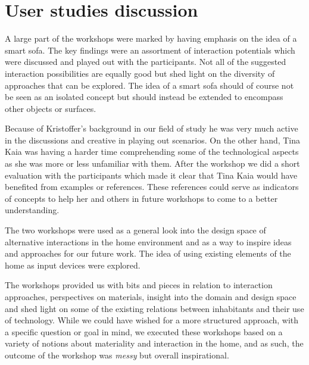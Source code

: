 \section{User studies discussion}

A large part of the workshops were marked by having emphasis on the idea of a smart sofa.
The key findings were an assortment of interaction potentials which were discussed and played out with the participants.
Not all of the suggested interaction possibilities are equally good but shed light on the diversity of approaches that can be explored.
The idea of a smart sofa should of course not be seen as an isolated concept but should instead be extended to encompass other objects or surfaces.

Because of Kristoffer's background in our field of study he was very much active in the discussions and creative in playing out scenarios.
On the other hand, Tina Kaia was having a harder time comprehending some of the technological aspects as she was more or less unfamiliar with them.
After the workshop we did a short evaluation with the participants which made it clear that Tina Kaia would have benefited from examples or references.
These references could serve as indicators of concepts to help her and others in future workshops to come to a better understanding.

The two workshops were used as a general look into the design space of alternative interactions in the home environment and as a way to inspire ideas and approaches for our future work.
The idea of using existing elements of the home as input devices were explored.

The workshops provided us with bits and pieces in relation to interaction approaches, perspectives on materials, insight into the domain and design space and shed light on some of the existing relations between inhabitants and their use of technology.
While we could have wished for a more structured approach, with a specific question or goal in mind, we executed these workshops based on a variety of notions about materiality and interaction in the home, and as such, the outcome of the workshop was \emph{messy} but overall inspirational.

